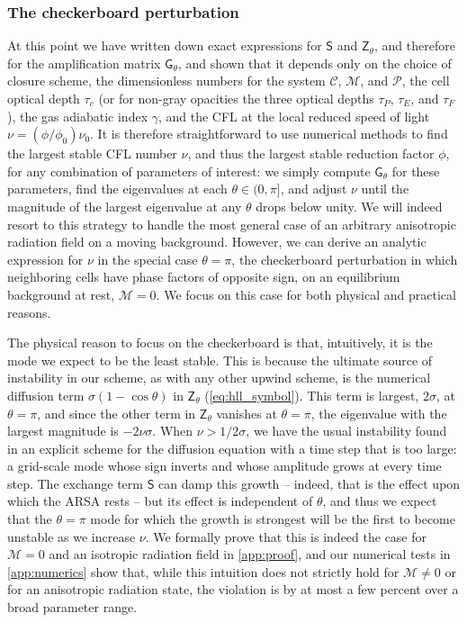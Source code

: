 \documentclass[preprint,12pt,authoryear]{elsarticle}
\newcommand{\tenS}{\mathsf{S}}
\newcommand{\tenG}{\mathsf{G}}
\newcommand{\tenZ}{\mathsf{Z}}
\newcommand{\calC}{\mathcal{C}}
\newcommand{\calP}{\mathcal{P}}
\newcommand{\calM}{\mathcal{M}}
\begin{document}
\subsubsection{The checkerboard perturbation}
\label{sssec:checkerboard}

At this point we have written down exact expressions for $\tenS$ and $\tenZ_\theta$, and therefore for the amplification matrix $\tenG_\theta$, and shown that it depends only on the choice of closure scheme, the dimensionless numbers for the system $\calC$, $\calM$, and $\calP$, the cell optical depth $\tau_c$ (or for non-gray opacities the three optical depths $\tau_P$, $\tau_E$, and $\tau_F$), the gas adiabatic index $\gamma$, and the CFL at the local reduced speed of light $\nu = (\phi/\phi_0) \nu_0$. It is therefore straightforward to use numerical methods to find the largest stable CFL number $\nu$, and thus the largest stable reduction factor $\phi$, for any combination of parameters of interest: we simply compute $\tenG_\theta$ for these parameters, find the eigenvalues at each $\theta \in (0,\pi]$, and adjust $\nu$ until the magnitude of the largest eigenvalue at any $\theta$ drops below unity. We will indeed resort to this strategy to handle the most general case of an arbitrary anisotropic radiation field on a moving background. However, we can derive an analytic expression for $\nu$ in the special case $\theta = \pi$, the checkerboard perturbation in which neighboring cells have phase factors of opposite sign, on an equilibrium background at rest, $\calM = 0$. We focus on this case for both physical and practical reasons.

The physical reason to focus on the checkerboard is that, intuitively, it is the mode we expect to be the least stable. This is because the ultimate source of instability in our scheme, as with any other upwind scheme, is the numerical diffusion term $\sigma(1-\cos\theta)$ in $\tenZ_\theta$ (\autoref{eq:hll_symbol}). This term is largest, $2\sigma$, at $\theta = \pi$, and since the other term in $\tenZ_\theta$ vanishes at $\theta=\pi$, the eigenvalue with the largest magnitude is $-2\nu\sigma$. When $\nu>1/2\sigma$, we have the usual instability found in an explicit scheme for the diffusion equation with a time step that is too large: a grid-scale mode whose sign inverts and whose amplitude grows at every time step. The exchange term $\tenS$ can damp this growth -- indeed, that is the effect upon which the ARSA rests -- but its effect is independent of $\theta$, and thus we expect that the $\theta = \pi$ mode for which the growth is strongest will be the first to become unstable as we increase $\nu$. We formally prove that this is indeed the case for $\calM = 0$ and an isotropic radiation field in \ref{app:proof}, and our numerical tests in \ref{app:numerics} show that, while this intuition does not strictly hold for $\calM \neq 0$ or for an anisotropic radiation state, the violation is by at most a few percent over a broad parameter range.
\end{document}
